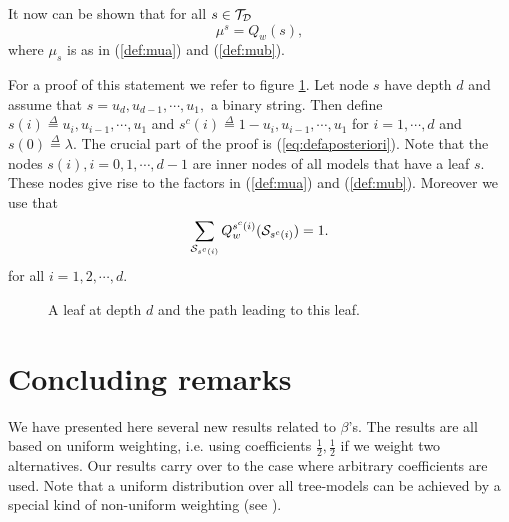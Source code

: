\documentclass[10pt,conference]{IEEEtran}
\newcommand{\half}{\frac{1}{2}}
\newcommand{\cS}{{\cal{S}}}
\newcommand{\cTD}{{\cal{T}_{D}}}
\newcommand{\define}{\stackrel{\Delta}{=}}
\begin{document}
It now can be shown that for all $s\in\cTD$
\begin{equation}
\mu^{s} = Q_{w}(s),
\end{equation}
where $\mu_s$ is as in (\ref{def:mua}) and (\ref{def:mub}).

For a proof of this statement we refer to figure \ref{fig:pathtoleaf}.
Let node $s$ have depth $d$ and assume that $s=u_{d},u_{d-1},\cdots,u_{1},$ a binary string.
Then define $s(i) \define u_{i},u_{i-1},\cdots,u_{1}$ and $s^{c}(i) \define 1-u_{i},u_{i-1},\cdots,u_{1}$ for $i=1,\cdots,d$ and $s(0)\define\lambda$.
The crucial part of the proof is (\ref{eq:defaposteriori}).
Note that the nodes $s(i), i=0,1,\cdots,d-1$ are inner nodes of all models that have a leaf $s$.
These nodes give rise to the factors in (\ref{def:mua}) and (\ref{def:mub}).
Moreover we use that
\begin{equation}
\sum_{\cS_{s^{c}(i)}} Q_{w}^{s^{c}(i)}(\cS_{s^{c}(i)}) =1.
\end{equation}
for all $i=1,2,\cdots,d$.
\begin{figure}
\centering

\caption{A leaf at depth $d$ and the path leading to this leaf.}
\label{fig:pathtoleaf}
\end{figure}

\section{Concluding remarks}
We have presented here several new results related to $\beta$'s.
The results are all based on uniform weighting, i.e. using coefficients $\half,\half$ if we weight two alternatives.
Our results carry over to the case where arbitrary coefficients are used.
Note that a uniform distribution over all tree-models can be achieved by a special kind of non-uniform weighting (see \cite{WilShtTja95}).
\end{document}

